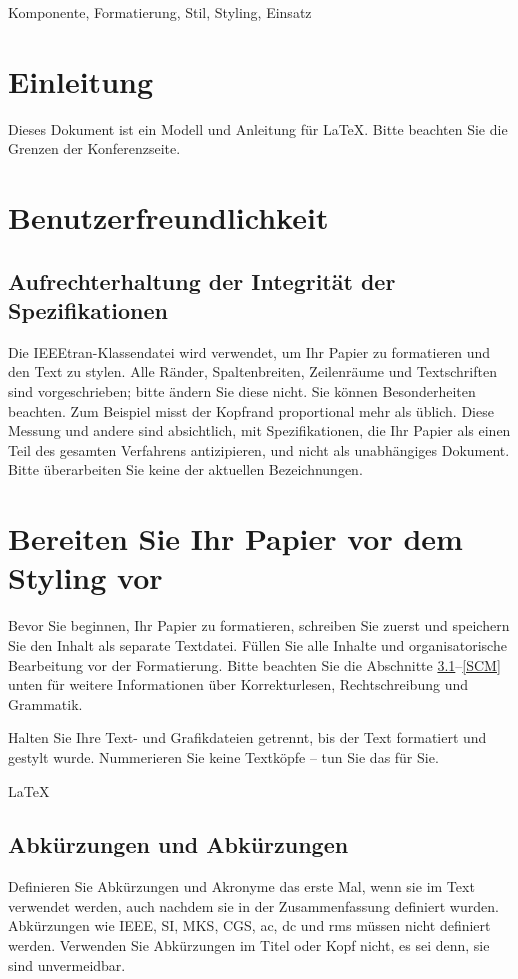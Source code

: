 \documentclass[conference]{IEEEtran}
\begin{document}
\begin{IEEEkeywords}
Komponente, Formatierung, Stil, Styling, Einsatz
\end{IEEEkeywords}

\section{Einleitung}
Dieses Dokument ist ein Modell und Anleitung für \LaTeX. Bitte beachten Sie die Grenzen der Konferenzseite. 

\section{Benutzerfreundlichkeit}

\subsection{Aufrechterhaltung der Integrität der Spezifikationen}

Die IEEEtran-Klassendatei wird verwendet, um Ihr Papier zu formatieren und den Text zu stylen. Alle Ränder, Spaltenbreiten, Zeilenräume und Textschriften sind vorgeschrieben; bitte ändern Sie diese nicht. Sie können Besonderheiten beachten. Zum Beispiel misst der Kopfrand proportional mehr als üblich. Diese Messung und andere sind absichtlich, mit Spezifikationen, die Ihr Papier als einen Teil des gesamten Verfahrens antizipieren, und nicht als unabhängiges Dokument. Bitte überarbeiten Sie keine der aktuellen Bezeichnungen.

\section{Bereiten Sie Ihr Papier vor dem Styling vor}
Bevor Sie beginnen, Ihr Papier zu formatieren, schreiben Sie zuerst und speichern Sie den Inhalt als separate Textdatei. Füllen Sie alle Inhalte und organisatorische Bearbeitung vor der Formatierung. Bitte beachten Sie die Abschnitte \ref{AA}–\ref{SCM} unten für weitere Informationen über Korrekturlesen, Rechtschreibung und Grammatik.

Halten Sie Ihre Text- und Grafikdateien getrennt, bis der Text formatiert und gestylt wurde. Nummerieren Sie keine Textköpfe – tun Sie das für Sie.

{\LaTeX}\subsection{Abkürzungen und Abkürzungen}\label{AA} Definieren Sie Abkürzungen und Akronyme das erste Mal, wenn sie im Text verwendet werden, auch nachdem sie in der Zusammenfassung definiert wurden. Abkürzungen wie IEEE, SI, MKS, CGS, ac, dc und rms müssen nicht definiert werden. Verwenden Sie Abkürzungen im Titel oder Kopf nicht, es sei denn, sie sind unvermeidbar.
\end{document}
